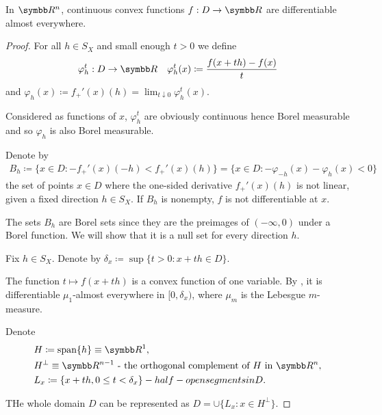 \begin{theorem}\label{thm:rn_continuous_convex_frechet_almost_everywhere}\cite[exercise 1.17]{Phelps1993}
  In \( \R^n \), continuous convex functions \( f: D \to \R \) are differentiable almost everywhere.
\end{theorem}
\begin{proof}
  For all \( h \in S_X \) and small enough \( t > 0 \) we define
  \begin{align*}
    &\varphi_h^t: D \to \R
    &\varphi_h^t(x) \coloneqq \frac {f(x + th) - f(x)} t
  \end{align*}
  and \( \varphi_h(x) \coloneqq f_+'(x)(h) = \lim_{t \downarrow 0} \varphi_h^t(x) \).

  Considered as functions of \( x \), \( \varphi_h^t \) are obviously continuous hence Borel measurable and so \( \varphi_h \) is also Borel measurable.

  Denote by
  \begin{align*}
    B_h
    \coloneqq
    \{ x \in D \colon -f_+'(x)(-h) < f_+'(x)(h) \}
    =
    \{ x \in D \colon -\varphi_{-h}(x) - \varphi_h(x) < 0 \}
  \end{align*}
  the set of points \( x \in D \) where the one-sided derivative \( f_+'(x)(h) \) is not linear, given a fixed direction \( h \in S_X \). If \( B_h \) is nonempty, \( f \) is not differentiable at \( x \).

  The sets \( B_h \) are Borel sets since they are the preimages of \( (-\infty, 0) \) under a Borel function. We will show that it is a null set for every direction \( h \).

  Fix \( h \in S_X \). Denote by \( \delta_x \coloneqq \sup \{ t > 0 \colon x + th \in D \} \).

  The function \( t \mapsto f(x + th) \) is a convex function of one variable. By \cite[theorem 1.16]{Phelps1993}, it is differentiable \( \mu_1 \)-almost everywhere in \( [0, \delta_x) \), where \( \mu_m \) is the Lebesgue \( m \)-measure.

  Denote
  \begin{align*}
    &H \coloneqq \Span\{ h \} \equiv \R^1,
    \\
    &H^\perp \equiv \R^{n-1} \text{ - the orthogonal complement of \( H \) in \( \R^n \)},
    \\
    &L_x \coloneqq \{ x + th, 0 \leq t < \delta_x \} - half-open segments in D.
  \end{align*}

  THe whole domain \( D \) can be represented as \( D = \cup \{ L_x \colon x \in H^\perp \} \).


\end{proof}
